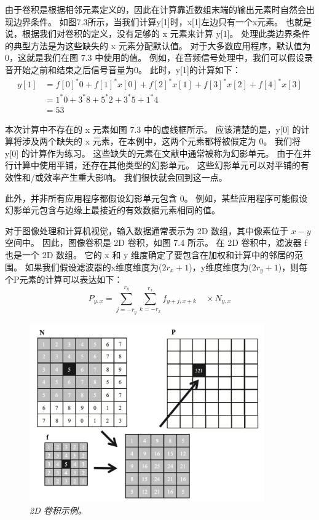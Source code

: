 由于卷积是根据相邻元素定义的，因此在计算靠近数组末端的输出元素时自然会出现边界条件。 
如图7.3所示，当我们计算y[1]时，x[1]左边只有一个x元素。 也就是说，根据我们对卷积的定义，没有足够的 x 元素来计算 y[1]。 
处理此类边界条件的典型方法是为这些缺失的 x 元素分配默认值。 
对于大多数应用程序，默认值为 0，这就是我们在图 7.3 中使用的值。 
例如，在音频信号处理中，我们可以假设录音开始之前和结束之后信号音量为0。 此时，y[1]的计算如下：
$$
\begin{aligned}
y[1] & =f[0]^{*} 0+f[1]^{*} x[0]+f[2]^{*} x[1]+f[3]^{*} x[2]+f[4]^{*} x[3] \\
& =1^{*} 0+3^{*} 8+5^{*} 2+3^{*} 5+1^{*} 4 \\
& =53
\end{aligned}
$$

本次计算中不存在的 x 元素如图 7.3 中的虚线框所示。 
应该清楚的是，y[0] 的计算将涉及两个缺失的 x 元素，在本例中，这两个元素都将被假定为 0。 
我们将 y[0] 的计算作为练习。 这些缺失的元素在文献中通常被称为幻影单元。 
由于在并行计算中使用平铺，还存在其他类型的幻影单元。 这些幻影单元可以对平铺的有效性和/或效率产生重大影响。 
我们很快就会回到这一点。

此外，并非所有应用程序都假设幻影单元包含 0。
例如，某些应用程序可能假设幻影单元包含与边缘上最接近的有效数据元素相同的值。

对于图像处理和计算机视觉，输入数据通常表示为 2D 数组，其中像素位于 $x-y$ 空间中。 
因此，图像卷积是 2D 卷积，如图 7.4 所示。 在 2D 卷积中，滤波器 f 也是一个 2D 数组。 
它的 x 和 y 维度确定了要包含在加权和计算中的邻居的范围。 
如果我们假设滤波器的x维度维度为($2r_x + 1$)，y维度维度为($2r_y + 1$)，则每个P元素的计算可以表达如下：
$$
P_{y, x}=\sum_{j=-r_{y}}^{r_{y}} \sum_{k=-r_{x}}^{r_{x}} f_{y+j, x+k} \quad \times N_{y, x}
$$

\begin{figure}[H]
	\centering
	\includegraphics[width=0.9\textwidth]{figs/F7.4.png}
	\caption{\textit{2D 卷积示例。}}
\end{figure}

